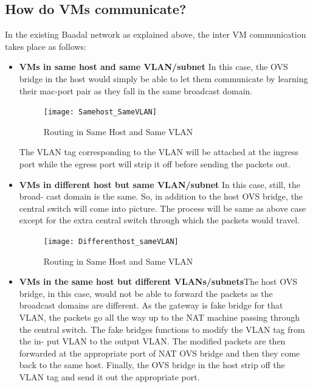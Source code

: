 \subsection{How do VMs communicate?
}
In the existing
Baadal network as explained above, the inter VM communication takes place
as follows:


\begin{itemize}
   
    \item \textbf{VMs in same host and same VLAN/subnet} In this case, the OVS bridge
in the host would simply be able to let them communicate by learning their
mac-port pair as they fall in the same broadcast domain. 

\begin{figure}[h]
\caption{Routing in Same Host and Same VLAN}
\centering
\texttt{[image: Samehost\_SameVLAN]}
\end{figure}

The VLAN
tag corresponding to the VLAN will be attached at the ingress port while
the egress port will strip it off before sending the packets out.


\pagebreak



     \item \textbf{VMs in different host but same VLAN/subnet} In this case, still, the broad-
cast domain is the same. So, in addition to the host OVS bridge, the
central switch will come into picture. The process will be same as above
case except for the extra central switch through which the packets would
travel.

\begin{figure}[h]
\caption{Routing in Same Host and Same VLAN}
\centering
\texttt{[image: Differenthost\_sameVLAN]}
\end{figure}

\pagebreak

      \item \textbf{VMs in the same host but different VLANs/subnets}The host OVS bridge,
in this case, would not be able to forward the packets as the broadcast
domains are different. As the gateway is fake bridge for that VLAN, the
packets go all the way up to the NAT machine passing through the central
switch. The fake bridges functions to modify the VLAN tag from the in-
put VLAN to the output VLAN. The modified packets are then forwarded
at the appropriate port of NAT OVS bridge and then they come back to
the same host. Finally, the OVS bridge in the host strip off the VLAN
tag and send it out the appropriate port.


\end{itemize}
